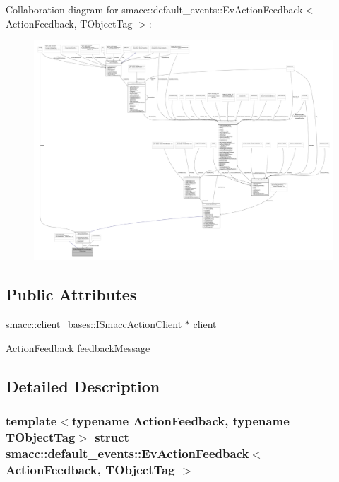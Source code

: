 Collaboration diagram for smacc\+:\+:default\+\_\+events\+:\+:Ev\+Action\+Feedback$<$ Action\+Feedback, T\+Object\+Tag $>$\+:
\nopagebreak
\begin{figure}[H]
\begin{center}
\leavevmode
\includegraphics[width=350pt]{structsmacc_1_1default__events_1_1EvActionFeedback__coll__graph}
\end{center}
\end{figure}
\subsection*{Public Attributes}
\begin{DoxyCompactItemize}
\item 
\hyperlink{classsmacc_1_1client__bases_1_1ISmaccActionClient}{smacc\+::client\+\_\+bases\+::\+I\+Smacc\+Action\+Client} $\ast$ \hyperlink{structsmacc_1_1default__events_1_1EvActionFeedback_a356e106d4c54e12dc81a0f3063ecff4a}{client}
\item 
Action\+Feedback \hyperlink{structsmacc_1_1default__events_1_1EvActionFeedback_aa04da2789df313666c6aa9480dc8287d}{feedback\+Message}
\end{DoxyCompactItemize}


\subsection{Detailed Description}
\subsubsection*{template$<$typename Action\+Feedback, typename T\+Object\+Tag$>$\newline
struct smacc\+::default\+\_\+events\+::\+Ev\+Action\+Feedback$<$ Action\+Feedback, T\+Object\+Tag $>$}



